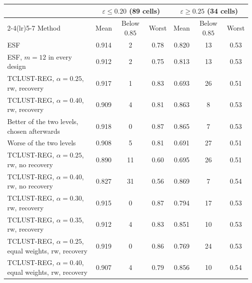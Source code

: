 \begin{tabular}{lcccccc}
\toprule
 & \multicolumn{3}{c}{$\varepsilon\le0.20$ (89 cells)} & \multicolumn{3}{c}{$\varepsilon\ge0.25$ (34 cells)} \\
\cmidrule(lr){2-4}\cmidrule(lr){5-7}
Method & Mean & Below $0.85$ & Worst & Mean & Below $0.85$ & Worst \\
\midrule
ESF & 0.914 & 2 & 0.78 & 0.820 & 13 & 0.53 \\
ESF, $m=12$ in every design & 0.912 & 2 & 0.75 & 0.813 & 13 & 0.53 \\
TCLUST-REG, $\alpha=0.25$, rw, recovery & 0.917 & 1 & 0.83 & 0.693 & 26 & 0.51 \\
TCLUST-REG, $\alpha=0.40$, rw, recovery & 0.909 & 4 & 0.81 & 0.863 & 8 & 0.53 \\
Better of the two levels, chosen afterwards & 0.918 & 0 & 0.87 & 0.865 & 7 & 0.53 \\
Worse of the two levels & 0.908 & 5 & 0.81 & 0.691 & 27 & 0.51 \\
TCLUST-REG, $\alpha=0.25$, rw, no recovery & 0.890 & 11 & 0.60 & 0.695 & 26 & 0.51 \\
TCLUST-REG, $\alpha=0.40$, rw, no recovery & 0.827 & 31 & 0.56 & 0.869 & 7 & 0.54 \\
\addlinespace
TCLUST-REG, $\alpha=0.30$, rw, recovery & 0.915 & 0 & 0.87 & 0.794 & 17 & 0.53 \\
TCLUST-REG, $\alpha=0.35$, rw, recovery & 0.912 & 4 & 0.83 & 0.851 & 10 & 0.53 \\
TCLUST-REG, $\alpha=0.25$, equal weights, rw, recovery & 0.919 & 0 & 0.86 & 0.769 & 24 & 0.53 \\
TCLUST-REG, $\alpha=0.40$, equal weights, rw, recovery & 0.907 & 4 & 0.79 & 0.856 & 10 & 0.54 \\
\bottomrule
\end{tabular}